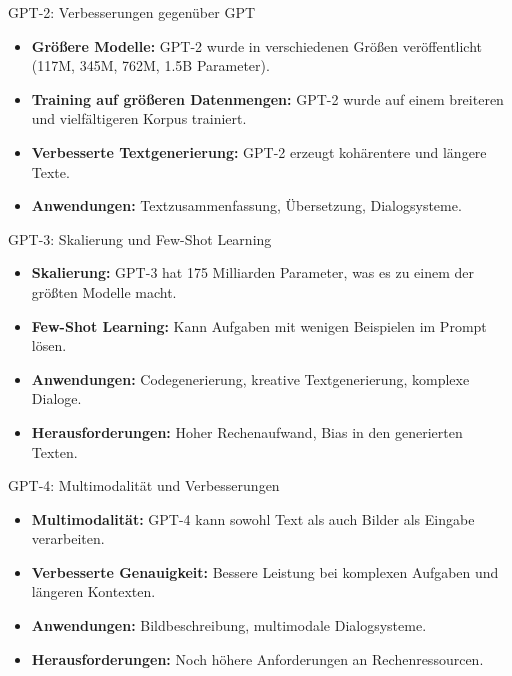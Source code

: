 \documentclass[aspectratio=1610, xcolor=dvipsnames, 9pt]{beamer}
\begin{document}
\begin{frame}{GPT-2: Verbesserungen gegenüber GPT}
  \begin{itemize}
    \item \textbf{Größere Modelle:} GPT-2 wurde in verschiedenen Größen veröffentlicht (117M, 345M, 762M, 1.5B Parameter).
    \item \textbf{Training auf größeren Datenmengen:} GPT-2 wurde auf einem breiteren und vielfältigeren Korpus trainiert.
    \item \textbf{Verbesserte Textgenerierung:} GPT-2 erzeugt kohärentere und längere Texte.
    \item \textbf{Anwendungen:} Textzusammenfassung, Übersetzung, Dialogsysteme.
  \end{itemize}
\end{frame}

\begin{frame}{GPT-3: Skalierung und Few-Shot Learning}
  \begin{itemize}
    \item \textbf{Skalierung:} GPT-3 hat 175 Milliarden Parameter, was es zu einem der größten Modelle macht.
    \item \textbf{Few-Shot Learning:} Kann Aufgaben mit wenigen Beispielen im Prompt lösen.
    \item \textbf{Anwendungen:} Codegenerierung, kreative Textgenerierung, komplexe Dialoge.
    \item \textbf{Herausforderungen:} Hoher Rechenaufwand, Bias in den generierten Texten.
  \end{itemize}
\end{frame}

\begin{frame}{GPT-4: Multimodalität und Verbesserungen}
  \begin{itemize}
    \item \textbf{Multimodalität:} GPT-4 kann sowohl Text als auch Bilder als Eingabe verarbeiten.
    \item \textbf{Verbesserte Genauigkeit:} Bessere Leistung bei komplexen Aufgaben und längeren Kontexten.
    \item \textbf{Anwendungen:} Bildbeschreibung, multimodale Dialogsysteme.
    \item \textbf{Herausforderungen:} Noch höhere Anforderungen an Rechenressourcen.
  \end{itemize}
\end{frame}
\end{document}
